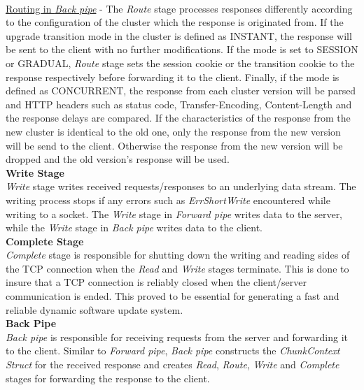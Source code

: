 \documentclass[a4paper,11pt,twoside]{article}
\begin{document}
\noindent\\
\underline{Routing in \textit{Back pipe}} - The \textit{Route} stage processes responses differently according to the configuration of the cluster which the response is originated from. If the upgrade transition mode in the cluster is defined as INSTANT, the response will be sent to the client with no further modifications. If the mode is set to SESSION or GRADUAL, \textit{Route} stage sets the session cookie or the transition cookie to the response respectively before forwarding it to the client. Finally, if the mode is defined as CONCURRENT, the response from each cluster version will be parsed and HTTP headers such as status code, Transfer-Encoding, Content-Length and the response delays are compared. If the characteristics  of the response from the new cluster is identical to the old one, only the response from the new version will be send to the client. Otherwise the response from the new version will be dropped and the old version's response will be used.\\

\noindent
\textbf{Write Stage} \\
\textit{Write} stage writes received requests/responses to an underlying data stream. The writing process stops if any errors such as \textit{ErrShortWrite} encountered while writing to a socket. The \textit{Write} stage in \textit{Forward pipe} writes data to the server, while the \textit{Write} stage in \textit{Back pipe} writes data to the client.   \\

\noindent
\textbf{Complete Stage}\\ 
\textit{Complete} stage is responsible for shutting down the writing and reading sides of the TCP connection when the \textit{Read} and \textit{Write} stages terminate. This is done to insure that a TCP connection is reliably closed when the client/server communication is ended. This proved to be essential for generating a fast and reliable dynamic software update system.\\ 

\noindent
\textbf{Back Pipe}\\
\textit{Back pipe} is responsible for receiving requests from the server and forwarding it to the client. Similar to \textit{Forward pipe}, \textit{Back pipe} constructs the \textit{ChunkContext Struct} for the received response and creates \textit{Read}, \textit{Route}, \textit{Write} and \textit{Complete} stages for forwarding the response to the client.\\\\
\end{document}
